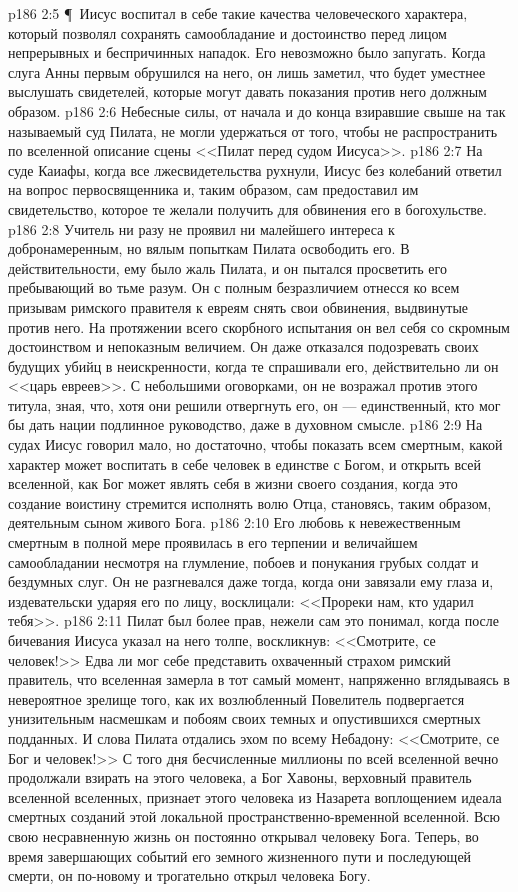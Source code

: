 \vs p186 2:5 \P\ Иисус воспитал в себе такие качества человеческого характера, который позволял сохранять самообладание и достоинство перед лицом непрерывных и беспричинных нападок. Его невозможно было запугать. Когда слуга Анны первым обрушился на него, он лишь заметил, что будет уместнее выслушать свидетелей, которые могут давать показания против него должным образом.
\vs p186 2:6 Небесные силы, от начала и до конца взиравшие свыше на так называемый суд Пилата, не могли удержаться от того, чтобы не распространить по вселенной описание сцены <<Пилат перед судом Иисуса>>.
\vs p186 2:7 На суде Каиафы, когда все лжесвидетельства рухнули, Иисус без колебаний ответил на вопрос первосвященника и, таким образом, сам предоставил им свидетельство, которое те желали получить для обвинения его в богохульстве.
\vs p186 2:8 Учитель ни разу не проявил ни малейшего интереса к добронамеренным, но вялым попыткам Пилата освободить его. В действительности, ему было жаль Пилата, и он пытался просветить его пребывающий во тьме разум. Он с полным безразличием отнесся ко всем призывам римского правителя к евреям снять свои обвинения, выдвинутые против него. На протяжении всего скорбного испытания он вел себя со скромным достоинством и непоказным величием. Он даже отказался подозревать своих будущих убийц в неискренности, когда те спрашивали его, действительно ли он <<царь евреев>>. С небольшими оговорками, он не возражал против этого титула, зная, что, хотя они решили отвергнуть его, он --- единственный, кто мог бы дать нации подлинное руководство, даже в духовном смысле.
\vs p186 2:9 На судах Иисус говорил мало, но достаточно, чтобы показать всем смертным, какой характер может воспитать в себе человек в единстве с Богом, и открыть всей вселенной, как Бог может являть себя в жизни своего создания, когда это создание воистину стремится исполнять волю Отца, становясь, таким образом, деятельным сыном живого Бога.
\vs p186 2:10 Его любовь к невежественным смертным в полной мере проявилась в его терпении и величайшем самообладании несмотря на глумление, побоев и понукания грубых солдат и бездумных слуг. Он не разгневался даже тогда, когда они завязали ему глаза и, издевательски ударяя его по лицу, восклицали: <<Прореки нам, кто ударил тебя>>.
\vs p186 2:11 Пилат был более прав, нежели сам это понимал, когда после бичевания Иисуса указал на него толпе, воскликнув: <<Смотрите, се человек!>> Едва ли мог себе представить охваченный страхом римский правитель, что вселенная замерла в тот самый момент, напряженно вглядываясь в невероятное зрелище того, как их возлюбленный Повелитель подвергается унизительным насмешкам и побоям своих темных и опустившихся смертных подданных. И слова Пилата отдались эхом по всему Небадону: <<Смотрите, се Бог и человек!>> С того дня бесчисленные миллионы по всей вселенной вечно продолжали взирать на этого человека, а Бог Хавоны, верховный правитель вселенной вселенных, признает этого человека из Назарета воплощением идеала смертных созданий этой локальной пространственно\hyp{}временной вселенной. Всю свою несравненную жизнь он постоянно открывал человеку Бога. Теперь, во время завершающих событий его земного жизненного пути и последующей смерти, он по\hyp{}новому и трогательно открыл человека Богу.
